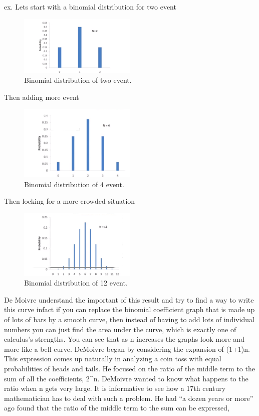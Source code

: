 \documentclass{article}
\begin{document}
ex. Lets start with a binomial distribution for two event
\begin{figure}[H]
\centering
\includegraphics[width=0.5\textwidth]{images/0.png}
\caption{\label{fig:bin2}Binomial distribution of two event.}
\end{figure}

Then adding more event
\begin{figure}[H]
\centering
\includegraphics[width=0.5\textwidth]{images/1.png}
\caption{\label{fig:bin4}Binomial distribution of 4 event.}
\end{figure}
Then locking for a more crowded situation
\begin{figure}[H]
\centering
\includegraphics[width=0.5\textwidth]{images/2.png}
\caption{\label{fig:bin12}Binomial distribution of 12 event.}
\end{figure}

De Moivre understand the important of this result and try to find a way to write this curve
infact if you can replace the binomial coefficient graph that is made up of lots of bars by a smooth curve, then
instead of having to add lots of individual numbers you can just find the area under the curve, which is
exactly one of calculus’s strengths. You can see that as n increases the graphs look more and more like a
bell-curve.
DeMoivre began by considering the expansion of (1+1)n. This expression comes up naturally in
analyzing a coin toss with equal probabilities of heads and tails. He focused on the ratio of the middle
term to the sum of all the coefficients, 2^n.
DeMoivre wanted to know what happens to the ratio when n gets very large. It is informative to see how a
17th century mathematician has to deal with such a problem.
He had “a dozen years or more” ago found that the ratio of the middle term to the sum can be expressed,
\end{document}
